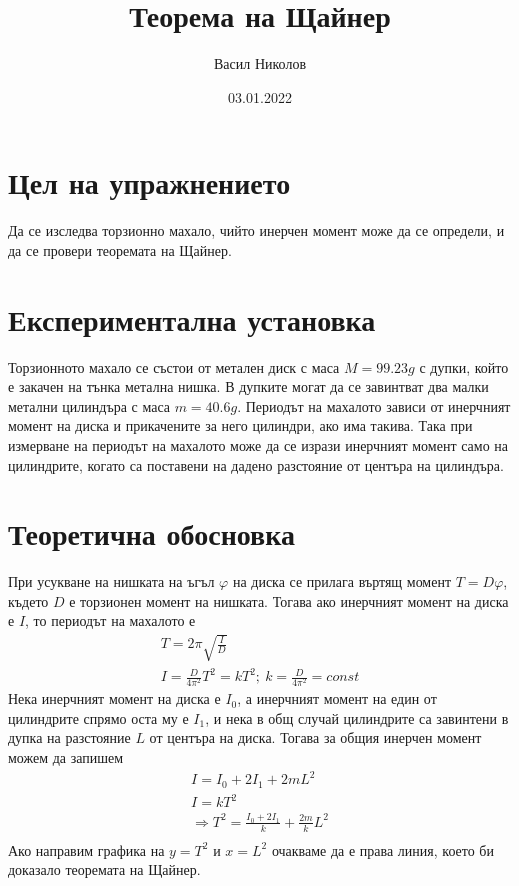\documentclass[aps, prb, twocolumn, a4paper, floatfix, reprint]{revtex4-2}
\let\phi\varphi
\begin{document}
\title{Теорема на Щайнер}
\author{Васил Николов}
\noaffiliation
\date{03.01.2022}
\maketitle

\section{Цел на упражнението}
Да се изследва торзионно махало, чийто инерчен момент може да се определи, и да се провери теоремата на Щайнер.

\section{Експериментална установка}
Торзионното махало се състои от метален диск с маса $M=99.23g$ с дупки, който е закачен на тънка метална нишка. В дупките могат да се завинтват два малки метални цилиндъра с маса $m=40.6g$. Периодът на махалото зависи от инерчният момент на диска и прикачените за него цилиндри, ако има такива. Така при измерване на периодът на махалото може да се изрази инерчният момент само на цилиндрите, когато са поставени на дадено разстояние от центъра на цилиндъра. 

\section{Теоретична обосновка}
При усукване на нишката на ъгъл $\phi$ на диска се прилага въртящ момент $T = D \phi$, където $D$ е торзионен момент на нишката. Тогава ако инерчният момент на диска е $I$, то периодът на махалото е 
\begin{gather*}
    T = 2\pi \sqrt{\frac{I}{D}} \\
    I = \frac{D}{4 \pi^2}T^2 = kT^2; \ k = \frac{D}{4\pi^2} = const
\end{gather*}
Нека инерчният момент на диска е $I_0$, а инерчният момент на един от цилиндрите спрямо оста му е $I_1$, и нека в общ случай цилиндрите са завинтени в дупка на разстояние $L$ от центъра на диска. Тогава за общия инерчен момент можем да запишем 
\begin{gather*}
    I = I_0 + 2I_1 + 2mL^2\\
    I = kT^2 \\
    \Rightarrow T^2 = \frac{I_0 + 2I_1}{k} + \frac{2m}{k}L^2 \\
\end{gather*}
Ако направим графика на $y=T^2$ и $x=L^2$ очакваме да е права линия, което би доказало теоремата на Щайнер. 
\end{document}

